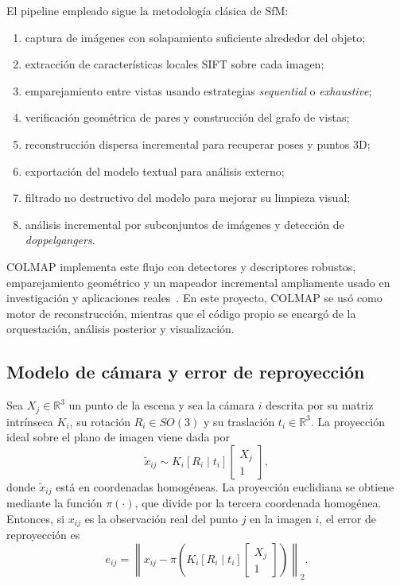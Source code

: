 \documentclass[conference]{IEEEtran}
\begin{document}
El pipeline empleado sigue la metodolog\'ia cl\'asica de SfM:
\begin{enumerate}
  \item captura de im\'agenes con solapamiento suficiente alrededor del objeto;
  \item extracci\'on de caracter\'isticas locales SIFT sobre cada imagen;
  \item emparejamiento entre vistas usando estrategias \emph{sequential} o \emph{exhaustive};
  \item verificaci\'on geom\'etrica de pares y construcci\'on del grafo de vistas;
  \item reconstrucci\'on dispersa incremental para recuperar poses y puntos 3D;
  \item exportaci\'on del modelo textual para an\'alisis externo;
  \item filtrado no destructivo del modelo para mejorar su limpieza visual;
  \item an\'alisis incremental por subconjuntos de im\'agenes y detecci\'on de \emph{doppelgangers}.
\end{enumerate}

COLMAP implementa este flujo con detectores y descriptores robustos, emparejamiento geom\'etrico y un mapeador incremental ampliamente usado en investigaci\'on y aplicaciones reales~\cite{b2,b3}. En este proyecto, COLMAP se us\'o como motor de reconstrucci\'on, mientras que el c\'odigo propio se encarg\'o de la orquestaci\'on, an\'alisis posterior y visualizaci\'on.

\subsection{Modelo de c\'amara y error de reproyecci\'on}

Sea \(X_j \in \mathbb{R}^3\) un punto de la escena y sea la c\'amara \(i\) descrita por su matriz intr\'inseca \(K_i\), su rotaci\'on \(R_i \in SO(3)\) y su traslaci\'on \(t_i \in \mathbb{R}^3\). La proyecci\'on ideal sobre el plano de imagen viene dada por
\begin{equation}
\tilde{x}_{ij} \sim K_i [R_i \mid t_i]
\begin{bmatrix}
X_j \\ 1
\end{bmatrix},
\end{equation}
donde \(\tilde{x}_{ij}\) est\'a en coordenadas homog\'eneas. La proyecci\'on euclidiana se obtiene mediante la funci\'on \(\pi(\cdot)\), que divide por la tercera coordenada homog\'enea. Entonces, si \(x_{ij}\) es la observaci\'on real del punto \(j\) en la imagen \(i\), el error de reproyecci\'on es
\begin{equation}
e_{ij} =
\left\|
x_{ij} - \pi\!\left(
K_i [R_i \mid t_i]
\begin{bmatrix}
X_j \\ 1
\end{bmatrix}
\right)
\right\|_2.
\end{equation}
\end{document}
